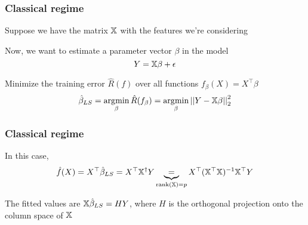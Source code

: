 \documentclass{beamer}
\begin{document}
\begin{frame}
\frametitle{Classical regime}
Suppose we have the matrix $\mathbb{X}$ with the features we're considering

\vsp
Now, we want to estimate a parameter vector $\beta$ in the model
\[
Y = \mathbb{X}\beta + \epsilon
\]

\vsp
Minimize the training error $\hat{R}(f)$ over all functions $f_\beta(X) = X^{\top}\beta$
\[
\hat\beta_{LS} = \operatorname*{\arg\!\min}_\beta \hat{R}(f_\beta) = \operatorname*{\arg\!\min}_\beta \left|\left| Y - \mathbb{X}\beta \right|\right|_2^2
\]
\end{frame}

\begin{frame}
\frametitle{Classical regime}

\vsp
In this case, 
\[
\hat{f}(X) = X^{\top} \hat\beta_{LS} 
= 
X^{\top} \mathbb{X}^{\dagger}Y 
\underbrace{=}_{\textrm{rank}(\mathbb{X}) = p} 
X^{\top}(\mathbb{X}^{\top} \mathbb{X})^{-1} \mathbb{X}^{\top} Y
\]
\vsp

The fitted values are $\mathbb{X}\hat\beta_{LS} = H Y$, where $H$ is the orthogonal projection onto the 
column space of $\mathbb{X}$

\end{frame}


%
%
\end{document}
